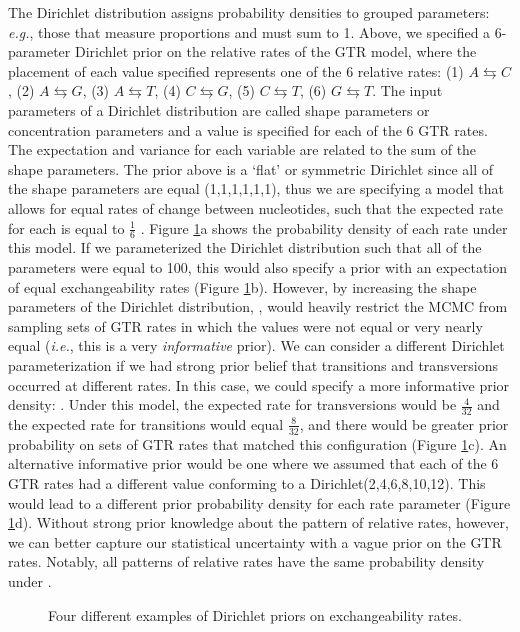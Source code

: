 The Dirichlet distribution assigns probability densities to grouped parameters: {\it e.g.}, those that measure proportions and must sum to 1. 
Above, we specified a 6-parameter Dirichlet prior on the relative rates of the GTR model, where the placement of each value specified represents one of the 6 relative rates: (1) $A\leftrightarrows C$, (2) $A\leftrightarrows G$, (3) $A\leftrightarrows T$, (4) $C\leftrightarrows G$, (5) $C\leftrightarrows T$, (6) $G\leftrightarrows T$. 
The input parameters of a Dirichlet distribution are called shape parameters or concentration parameters and a value is specified for each of the 6 GTR rates. 
The expectation and variance for each variable are related to the sum of the shape parameters.
The prior above is a `flat' or symmetric Dirichlet since all of the shape parameters are equal (1,1,1,1,1,1), thus we are specifying a model that allows for equal rates of change between nucleotides, such that the expected rate for each is equal to $\frac{1}{6}$ \citep{zwickl04}.
Figure \ref{dirichletFig}a shows the probability density of each rate under this model.
If we parameterized the Dirichlet distribution such that all of the parameters were equal to 100, this would also specify a prior with an expectation of equal exchangeability rates (Figure \ref{dirichletFig}b). 
However, by increasing the shape parameters of the Dirichlet distribution, , would heavily restrict the MCMC from sampling sets of GTR rates in which the values were not equal or very nearly equal ({\it i.e.}, this is a very {\em informative} prior). 
We can consider a different Dirichlet parameterization if we had strong prior belief that transitions and transversions occurred at different rates.
In this case, we could specify a more informative prior density: . 
Under this model, the expected rate for transversions would be $\frac{4}{32}$ and the expected rate for transitions would equal $\frac{8}{32}$, and there would be greater prior probability on sets of GTR rates that matched this configuration (Figure \ref{dirichletFig}c). 
An alternative informative prior would be one where we assumed that each of the 6 GTR rates had a different value conforming to a Dirichlet(2,4,6,8,10,12). 
This would lead to a different prior probability density for each rate parameter (Figure \ref{dirichletFig}d).
Without strong prior knowledge about the pattern of relative rates, however, we can better capture our statistical uncertainty with a vague prior on the GTR rates. 
Notably, all patterns of relative rates have the same probability density under .
\begin{figure}[h!]
\centering
{}
\caption{\small Four different examples of Dirichlet priors on exchangeability rates.}
\label{dirichletFig}
\end{figure}


